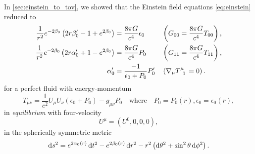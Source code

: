 In \cref{sec:einstein_to_tov}, we showed that the Einstein field equations \eqref{eq:einstein} reduced to
\begin{subequations}%
\begin{align}%
	\frac{1}{r^2} e^{-2 \beta_0} \left( 2 r \beta_0' - 1 + e^{2 \beta_0} \right)  &= \frac{8 \pi G}{c^4} \epsilon_0   && \left( G_{00} = \frac{8 \pi G}{c^4} T_{00} \right) , \label{eq:nstars:field_equations_equilibrium_00} \\
	\frac{1}{r^2} e^{-2 \beta_0} \left( 2 r \alpha_0' + 1 - e^{2 \beta_0} \right) &= \frac{8 \pi G}{c^4} P_0          && \left( G_{11} = \frac{8 \pi G}{c^4} T_{11} \right) , \label{eq:nstars:field_equations_equilibrium_11} \\
	\alpha_0'                                                                     &= \frac{-1}{\epsilon_0 + P_0} P_0' && \left( \nabla_\mu T\indices{^\mu_1} = 0 \right)    . \label{eq:nstars:field_equations_equilibrium_T}
\end{align}%
\label{eq:nstars:field_equations_equilibrium}%
\end{subequations}%
for a perfect fluid with energy-momentum
\begin{equation}
	T_{\mu \nu} = \frac{1}{c^2} U_\mu U_\nu (\epsilon_0 + P_0) - g_{\mu \nu} P_0
	\quad \text{where} \quad
	P_0 = P_0(r), \epsilon_0 = \epsilon_0(r) ,
\label{eq:nstars:energy_momentum}
\end{equation}
in \emph{equilibrium} with four-velocity
\begin{equation}
	U^\mu = (U^0, 0,0,0) ,
\label{eq:nstars:velocity_equilibrium}
\end{equation}
in the spherically symmetric metric
\begin{equation}
	\mathop{}\!\mathrm{d} s^2 = e^{2 \alpha_0(r)} \mathop{}\!\mathrm{d} t^2 - e^{2 \beta_0(r)} \mathop{}\!\mathrm{d} r^2 - r^2 \left( \mathop{}\!\mathrm{d} \theta^2 + \sin^2 \theta \mathop{}\!\mathrm{d} \phi^2 \right) .
\end{equation}

